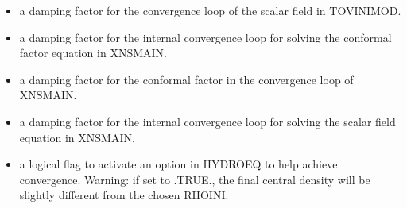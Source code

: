 \documentclass[letterpaper,10pt,english]{sphinxmanual}
\begin{document}
\begin{itemize}
\item {} 
\sphinxAtStartPar
{} \sphinxhyphen{} a damping factor for the convergence loop of the scalar field in TOVINIMOD.


\item {} 
\sphinxAtStartPar
{} \sphinxhyphen{} a damping factor for the internal convergence loop for solving the conformal factor equation in XNSMAIN.


\item {} 
\sphinxAtStartPar
{} \sphinxhyphen{} a damping factor for the conformal factor in the convergence loop of XNSMAIN.


\item {} 
\sphinxAtStartPar
{} \sphinxhyphen{} a damping factor for the internal convergence loop for solving the scalar field equation in XNSMAIN.


\item {} 
\sphinxAtStartPar
{} \sphinxhyphen{} a logical flag to activate an option in HYDROEQ to help achieve convergence. Warning: if set to .TRUE., the final central density will be slightly different from the chosen RHOINI.

\end{itemize}
\end{document}
